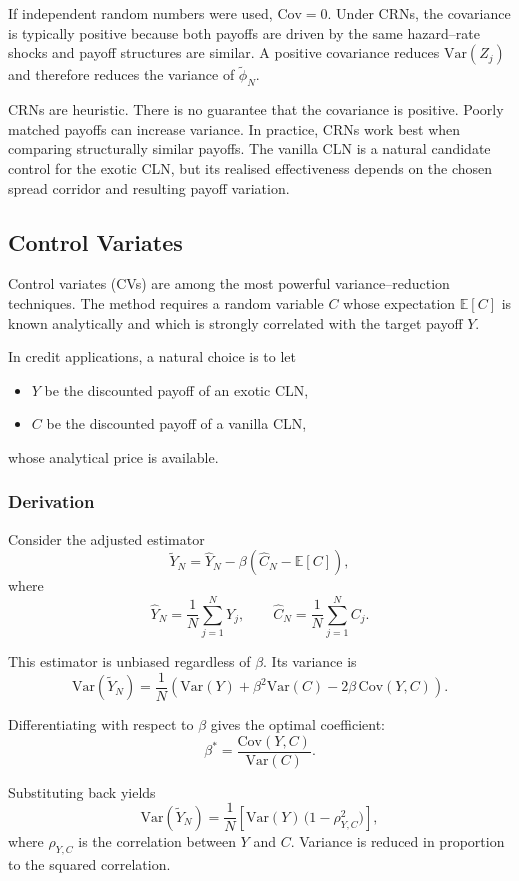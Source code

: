 If independent random numbers were used, $\mathrm{Cov}=0$. Under CRNs, the
covariance is typically positive because both payoffs are driven by the same
hazard--rate shocks and payoff structures are similar. A positive covariance
reduces $\mathrm{Var}(Z_j)$ and therefore reduces the variance of
$\tilde{\phi}_N$.

CRNs are heuristic. There is no guarantee that the covariance is positive.
Poorly matched payoffs can increase variance. In practice, CRNs work best when
comparing structurally similar payoffs. The vanilla CLN is a natural candidate
control for the exotic CLN, but its realised effectiveness depends on the chosen
spread corridor and resulting payoff variation.

\subsection{Control Variates}

Control variates (CVs) are among the most powerful variance--reduction
techniques. The method requires a random variable $C$ whose expectation
$\mathbb{E}[C]$ is known analytically and which is strongly correlated with the
target payoff $Y$.

In credit applications, a natural choice is to let
\begin{itemize}
\item $Y$ be the discounted payoff of an exotic CLN,
\item $C$ be the discounted payoff of a vanilla CLN,
\end{itemize}
whose analytical price is available.

\subsubsection*{Derivation}

Consider the adjusted estimator
\[
\tilde{Y}_N = \hat{Y}_N - \beta(\hat{C}_N - \mathbb{E}[C]),
\]
where
\[
\hat{Y}_N = \frac{1}{N}\sum_{j=1}^N Y_j,
\qquad
\hat{C}_N = \frac{1}{N}\sum_{j=1}^N C_j.
\]

This estimator is unbiased regardless of $\beta$. Its variance is
\[
\mathrm{Var}(\tilde{Y}_N)
= \frac{1}{N}\left(
\mathrm{Var}(Y) + \beta^2 \mathrm{Var}(C)
- 2\beta\,\mathrm{Cov}(Y,C)
\right).
\]

Differentiating with respect to $\beta$ gives the optimal coefficient:
\[
\beta^*
= \frac{\mathrm{Cov}(Y,C)}{\mathrm{Var}(C)}.
\]

Substituting back yields
\[
\mathrm{Var}(\tilde{Y}_N)
= \frac{1}{N}
\left[
\mathrm{Var}(Y)\,\bigl(1 - \rho_{Y,C}^2\bigr)
\right],
\]
where $\rho_{Y,C}$ is the correlation between $Y$ and $C$. Variance is reduced
in proportion to the squared correlation.

